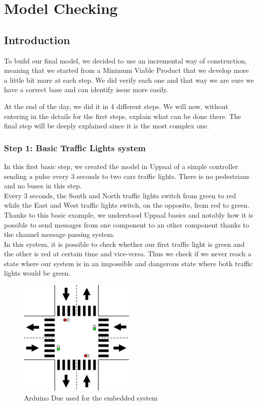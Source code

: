 \section{Model Checking}
\subsection{Introduction}
To build our final model, we decided to use an incremental way of construction, meaning that we started from a Minimum Viable Product that we develop more a little bit more at each step. We did verify each one and that way we are sure we have a correct base and can identify issue more easily.

At the end of the day, we did it in 4 different steps. We will now, without entering in the details for the first steps, explain what can be done there. The final step will be deeply explained since it is the most complex one.

\subsubsection{Step 1: Basic Traffic Lights system}
In this first basic step, we created the model in Uppaal of a simple controller sending a pulse every 3 seconds to two cars traffic lights. There is no pedestrians and no buses in this step. \\
Every 3 seconds, the South and North traffic lights switch from green to red while the East and West traffic lights switch, on the opposite, from red to green. \\

Thanks to this basic example, we understood Uppaal basics and notably how it is possible to send messages from one component to an other component thanks to the channel message passing system. \\

In this system, it is possible to check whether our first traffic light is green and the other is red at certain time and vice-versa. Thus we check if we never reach a state where our system is in an impossible and dangerous state where both traffic lights would be green.


\begin{figure}[H]\label{fig:arduino}
  \centering
    \includegraphics[width=0.5\textwidth]{picture/model/trafficlight_step1_s1.png}
    \caption{Arduino Due used for the embedded system}
\end{figure}

